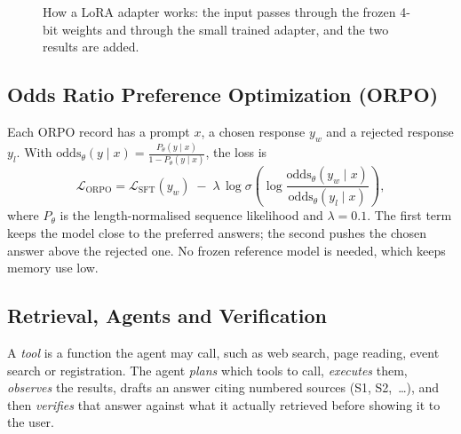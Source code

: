 \documentclass[11pt,a4paper]{article}
\begin{document}
\begin{figure}[H]
\centering
{}
\caption{How a LoRA adapter works: the input passes through the frozen 4-bit weights and through the small trained adapter, and the two results are added.}
\label{fig:lora}
\end{figure}

\subsection{Odds Ratio Preference Optimization (ORPO)}
Each ORPO record has a prompt $x$, a chosen response $y_w$ and a rejected response $y_l$. With
$\mathrm{odds}_\theta(y\mid x) = \frac{P_\theta(y\mid x)}{1-P_\theta(y\mid x)}$, the loss is
\begin{equation}
  \mathcal{L}_{\text{ORPO}} = \mathcal{L}_{\text{SFT}}(y_w)
  \;-\; \lambda \,\log\sigma\!\left(\log\frac{\mathrm{odds}_\theta(y_w\mid x)}{\mathrm{odds}_\theta(y_l\mid x)}\right),
\end{equation}
where $P_\theta$ is the length-normalised sequence likelihood and $\lambda=0.1$. The first term keeps
the model close to the preferred answers; the second pushes the chosen answer above the rejected one.
No frozen reference model is needed, which keeps memory use low.

\subsection{Retrieval, Agents and Verification}
A \emph{tool} is a function the agent may call, such as web search, page reading, event search or
registration. The agent \emph{plans} which tools to call, \emph{executes} them, \emph{observes} the
results, drafts an answer citing numbered sources (S1, S2,~\ldots), and then \emph{verifies} that answer
against what it actually retrieved before showing it to the user.
\end{document}
